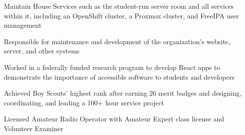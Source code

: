 \vspace{2pt plus 1pt minus 1pt}


\smallskip
\smallskip


\medskip


\medskip


Maintain House Services such as the student-run server room and all services within it, including an OpenShift cluster, a Proxmox cluster, and FreeIPA user management

\divider

Responsible for maintenance and development of the organization's website, server, and other systems

\divider

Worked in a federally funded research program to develop React apps to demonstrate the importance of accessible software to students and developers

\divider

Achieved Boy Scouts' highest rank after earning 26 merit badges and designing, coordinating, and leading a 100+ hour service project

\divider

Licensed Amateur Radio Operator with Amateur Expert class license and Volunteer Examiner


